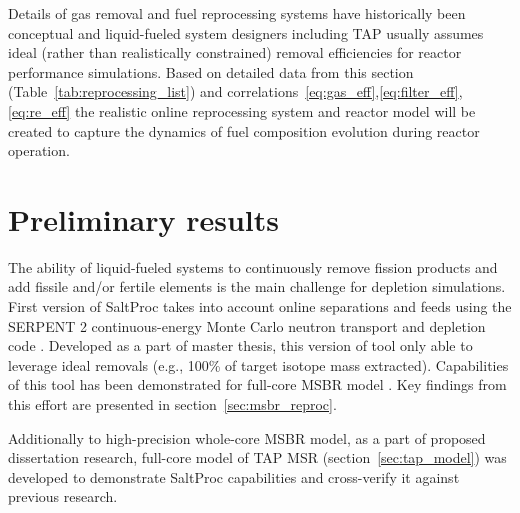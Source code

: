 Details of gas removal and fuel reprocessing systems have historically been conceptual 
and liquid-fueled system designers including \gls{TAP} usually assumes ideal (rather 
than realistically constrained) removal efficiencies for reactor performance simulations.
Based on detailed data from this section (Table~\ref{tab:reprocessing_list}) and 
correlations~\ref{eq:gas_eff},\ref{eq:filter_eff},\ref{eq:re_eff} the realistic 
online reprocessing system and reactor model will be created to capture the dynamics 
of fuel composition evolution during reactor operation.


\section{Preliminary results}
The ability of liquid-fueled systems to continuously remove fission products and add 
fissile and/or fertile elements is the main challenge for depletion simulations. 
First version of SaltProc takes into account online separations and feeds using the 
SERPENT 2 continuous-energy Monte Carlo neutron transport and depletion code 
\cite{rykhlevskii_arfc/saltproc_2018}. Developed as a part of master thesis, this 
version of tool only able to leverage ideal 
removals (e.g., 100\% of target isotope mass extracted). Capabilities of this tool 
has been demonstrated for full-core \gls{MSBR} model \cite{rykhlevskii_modeling_2019}. 
Key findings from this effort are presented in section~\ref{sec:msbr_reproc}.

Additionally to high-precision whole-core \gls{MSBR} model, as a part of 
proposed dissertation research, full-core model of 
\gls{TAP} \gls{MSR} (section~\ref{sec:tap_model}) was developed to 
demonstrate SaltProc capabilities and cross-verify it against previous research.

